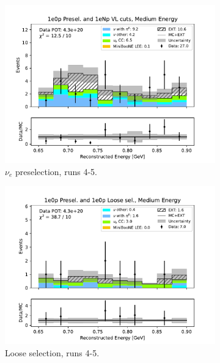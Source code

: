 \begin{figure}[H]
\begin{subfigure}{0.5\linewidth}
        \includegraphics[width=\linewidth]{technote/Sidebands/Figures/NearSideband/near_sideband_reco_e_run4b4c4d5_ZP_ZP_MEDIUM_ENERGY.pdf}
        \caption{$\nu_e$ preselection, runs 4-5.}
    \end{subfigure}%
    \begin{subfigure}{0.5\linewidth}
        \includegraphics[width=\linewidth]{technote/Sidebands/Figures/NearSideband/near_sideband_reco_e_run4b4c4d5_ZP_ZPLOOSESEL_MEDIUM_ENERGY.pdf}
        \caption{Loose selection, runs 4-5.}
    \end{subfigure}
    \begin{subfigure}{0.5\linewidth}

\end{subfigure}
\end{figure}
